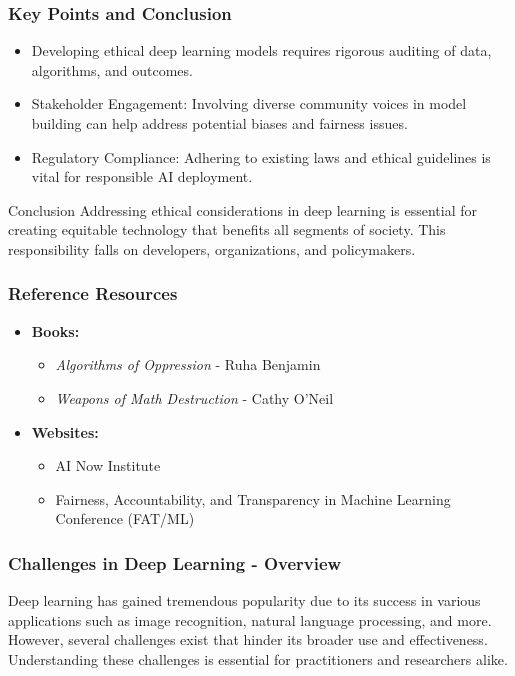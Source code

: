 \documentclass[aspectratio=169]{beamer}
\begin{document}
\begin{frame}[fragile]
    \frametitle{Key Points and Conclusion}
    
    \begin{itemize}
        \item Developing ethical deep learning models requires rigorous auditing of data, algorithms, and outcomes.
        \item Stakeholder Engagement: Involving diverse community voices in model building can help address potential biases and fairness issues.
        \item Regulatory Compliance: Adhering to existing laws and ethical guidelines is vital for responsible AI deployment.
    \end{itemize}

    \begin{block}{Conclusion}
    Addressing ethical considerations in deep learning is essential for creating equitable technology that benefits all segments of society. This responsibility falls on developers, organizations, and policymakers.
    \end{block}
\end{frame}

\begin{frame}[fragile]
    \frametitle{Reference Resources}
    
    \begin{itemize}
        \item \textbf{Books:}
        \begin{itemize}
            \item \textit{Algorithms of Oppression} - Ruha Benjamin
            \item \textit{Weapons of Math Destruction} - Cathy O'Neil
        \end{itemize}
        \item \textbf{Websites:}
        \begin{itemize}
            \item AI Now Institute
            \item Fairness, Accountability, and Transparency in Machine Learning Conference (FAT/ML)
        \end{itemize}
    \end{itemize}
\end{frame}

\begin{frame}[fragile]
    \frametitle{Challenges in Deep Learning - Overview}
    Deep learning has gained tremendous popularity due to its success in various applications such as image recognition, natural language processing, and more. However, several challenges exist that hinder its broader use and effectiveness. Understanding these challenges is essential for practitioners and researchers alike.
\end{frame}
\end{document}

